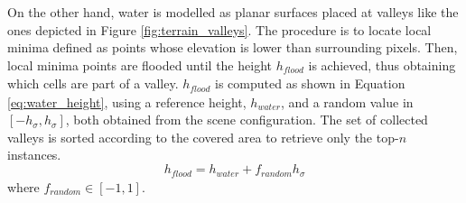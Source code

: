 On the other hand, water is modelled as planar surfaces placed at valleys like the ones depicted in Figure \ref{fig:terrain_valleys}. The procedure is to locate local minima defined as points whose elevation is lower than surrounding pixels. Then, local minima points are flooded until the height $h_{\textit{flood}}$ is achieved, thus obtaining which cells are part of a valley. $h_{\textit{flood}}$ is computed as shown in Equation \ref{eq:water_height}, using a reference height, $h_{\textit{water}}$, and a random value in $[-h_{\sigma}, h_{\sigma}]$, both obtained from the scene configuration. The set of collected valleys is sorted according to the covered area to retrieve only the top-$n$ instances. 
\begin{equation}
    \label{eq:water_height}
    h_{\textit{flood}} = h_{\textit{water}} + f_{\textit{random}}h_{\sigma}
\end{equation}
where $f_{\textit{random}} \in [-1, 1]$.

